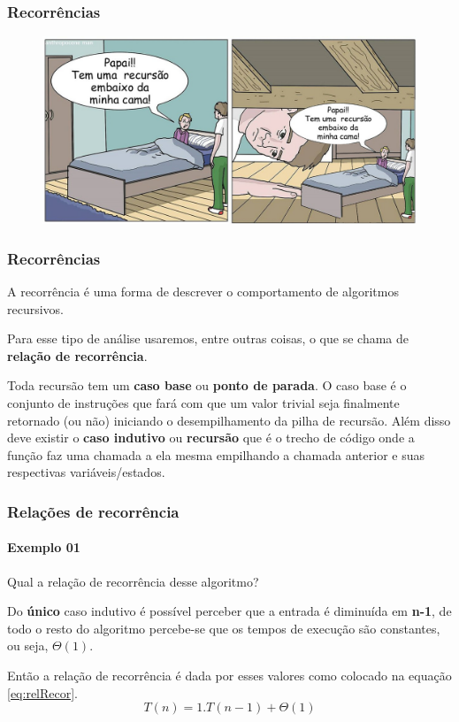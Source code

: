 \begin{frame}
	\frametitle{Recorrências}
	\begin{figure}
		\centering
		\includegraphics[width=1\linewidth]{images/recursivo}
		\caption{}
		\label{fig:recursivo}
	\end{figure}
\end{frame}

\begin{frame}
	\frametitle{Recorrências}
	\par A recorrência é uma forma de descrever o comportamento de algoritmos recursivos.\newline
	\par Para esse tipo de análise usaremos, entre outras coisas, o que se chama de \textbf{relação de recorrência}.
	\par Toda recursão tem um \textbf{caso base} ou \textbf{ponto de parada}. O caso base é o conjunto de instruções que fará com que um valor trivial seja finalmente retornado (ou não) iniciando o desempilhamento da pilha de recursão. Além disso deve existir o \textbf{caso indutivo} ou \textbf{recursão} que é o trecho de código onde a função faz uma chamada a ela mesma empilhando a chamada anterior e suas respectivas variáveis/estados.
	
\end{frame}

\begin{frame}
	\frametitle{Relações de recorrência}
	\framesubtitle{Exemplo 01}
	\par Qual a relação de recorrência desse algoritmo?\\
	
	\par Do \textbf{único} caso indutivo é possível perceber que a entrada é diminuída em \textbf{n-1}, de todo o resto do algoritmo percebe-se que os tempos de execução são constantes, ou seja, $\Theta(1)$.
	\par Então a relação de recorrência é dada por esses valores como colocado na equação \ref{eq:relRecor}. 
	\begin{equation}
		\label{eq:relRecor}
		T(n) = 1.T(n-1) + \Theta(1)
	\end{equation}
\end{frame}

